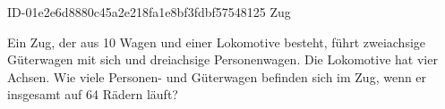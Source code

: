 \begin{exercise}
      {ID-01e2e6d8880c45a2e218fa1e8bf3fdbf57548125}
      {Zug}
  \ifproblem\problem\par
    Ein Zug, der aus 10 Wagen und einer Lokomotive besteht, führt zweiachsige
    Güterwagen mit sich und dreiachsige Personenwagen. Die Lokomotive hat vier
    Achsen. Wie viele Personen- und Güterwagen befinden sich im Zug, wenn
    er insgesamt auf 64 Rädern läuft?
  \fi
\end{exercise}
